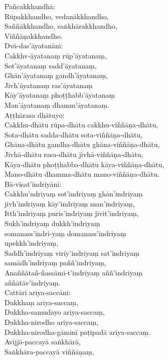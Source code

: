 Pañcakkhandhā:\\
Rūpakkhandho, vedanākkhandho,\\
Saññākkhandho, saṅkhārakkhandho,\\
Viññāṇakkhandho.\\
Dvā-das'āyatanāni:\\
Cakkhv-āyatanaṃ rūp'āyatanaṃ,\\
Sot'āyatanaṃ sadd'āyatanaṃ,\\
Ghān'āyatanaṃ gandh'āyatanaṃ,\\
Jivh'āyatanaṃ ras'āyatanaṃ\\
Kāy'āyatanaṃ phoṭṭhabb'āyatanaṃ\\
Man'āyatanaṃ dhamm'āyatanaṃ.\\
Aṭṭhārasa dhātuyo:\\
Cakkhu-dhātu rūpa-dhātu cakkhu-viññāṇa-dhātu,\\
Sota-dhātu sadda-dhātu sota-viññāṇa-dhātu,\\
Ghāna-dhātu gandha-dhātu ghāna-viññāṇa-dhātu,\\
Jivhā-dhātu rasa-dhātu jivhā-viññāṇa-dhātu,\\
Kāya-dhātu phoṭṭhabba-dhātu kāya-viññāṇa-dhātu,\\
Mano-dhātu dhamma-dhātu mano-viññāṇa-dhātu.\\
Bā-vīsat'indriyāni:\\
Cakkhu'ndriyaṃ sot'indriyaṃ ghān'indriyaṃ\\
jivh'indriyaṃ kāy'indriyaṃ man'indriyaṃ,\\
Itth'indriyaṃ puris'indriyaṃ jīvit'indriyaṃ,\\
Sukh'indriyaṃ dukkh'indriyaṃ\\
somanass'indri-yaṃ domanass'indriyaṃ\\
upekkh'indriyaṃ,\\
Saddh'indriyaṃ viriy'indriyaṃ sat'indriyaṃ\\
samādh'indriyaṃ paññ'indriyaṃ,\\
Anaññātañ-ñassāmī-t'indriyaṃ aññ'indriyaṃ\\
aññātāv'indriyaṃ.\\
Cattāri ariya-saccāni:\\
Dukkhaṃ ariya-saccaṃ,\\
Dukkha-samudayo ariya-saccaṃ,\\
Dukkha-nirodho ariya-saccaṃ,\\
Dukkha-nirodha-gāminī paṭipadā ariya-saccaṃ.\\
Avijjā-paccayā saṅkhārā,\\
Saṅkhāra-paccayā viññāṇaṃ,\\
